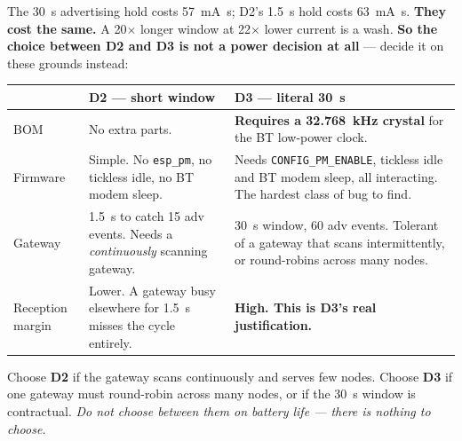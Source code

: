 \documentclass[11pt,a4paper]{article}
\begin{document}
\noindent
The \SI{30}{\second} advertising hold costs \SI{57}{\milli\ampere\second}; D2's
\SI{1.5}{\second} hold costs \SI{63}{\milli\ampere\second}. \textbf{They cost the same.} A
\num{20}$\times$ longer window at \num{22}$\times$ lower current is a wash. \textbf{So the choice
between D2 and D3 is not a power decision at all} --- decide it on these grounds instead:

\begin{center}
\begin{tabularx}{\textwidth}{lXX}
\toprule
& \textbf{D2 --- short window} & \textbf{D3 --- literal \SI{30}{\second}} \\
\midrule
BOM       & No extra parts. & \textbf{Requires a \SI{32.768}{\kilo\hertz} crystal} for the BT low-power clock. \\
Firmware  & Simple. No \texttt{esp\_pm}, no tickless idle, no BT modem sleep. & Needs \texttt{CONFIG\_PM\_ENABLE}, tickless idle and BT modem sleep, all interacting. The hardest class of bug to find. \\
Gateway   & \SI{1.5}{\second} to catch \num{15} adv events. Needs a \emph{continuously} scanning gateway. & \SI{30}{\second} window, \num{60} adv events. Tolerant of a gateway that scans intermittently, or round-robins across many nodes. \\
Reception margin & Lower. A gateway busy elsewhere for \SI{1.5}{\second} misses the cycle entirely. & \textbf{High. This is D3's real justification.} \\
\bottomrule
\end{tabularx}
\end{center}

\noindent
Choose \textbf{D2} if the gateway scans continuously and serves few nodes. Choose \textbf{D3} if
one gateway must round-robin across many nodes, or if the \SI{30}{\second} window is contractual.
\emph{Do not choose between them on battery life --- there is nothing to choose.}

\medskip
\noindent
{}

\end{document}
